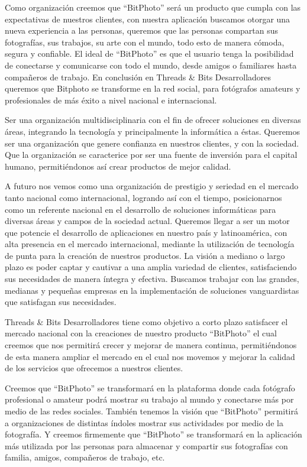 \documentclass{memoria}
\begin{document}
Como organización creemos que “BitPhoto” será un producto que cumpla con las expectativas de nuestros clientes, con nuestra aplicación buscamos otorgar una nueva experiencia a las personas, queremos que las personas compartan sus fotografías, sus trabajos, su arte con el mundo, todo esto de manera cómoda, segura y confiable. El ideal de “BitPhoto” es que el usuario tenga la posibilidad de conectarse y comunicarse con todo el mundo, desde amigos o familiares hasta compañeros de trabajo. En conclusión en Threads \& Bits Desarrolladores queremos que Bitphoto se transforme en la red social, para fotógrafos amateurs y profesionales de más éxito a nivel nacional e internacional.




Ser una organización multidisciplinaria con el fin de ofrecer soluciones en diversas áreas, integrando la tecnología y principalmente la informática a éstas. Queremos ser una organización que genere confianza en nuestros clientes, y con la sociedad. Que la organización se caracterice por ser una fuente de inversión para el capital humano, permitiéndonos así crear productos de mejor calidad.

A futuro nos vemos como una organización de prestigio y seriedad en el mercado tanto nacional como internacional, logrando así con el tiempo, posicionarnos como un referente nacional en el desarrollo de soluciones informáticas para diversas áreas y campos de la sociedad actual. Queremos llegar a ser un motor que potencie el desarrollo de aplicaciones en nuestro país y latinoamérica, con alta presencia en el mercado internacional, mediante la utilización de tecnología de punta para la creación de nuestros productos. La visión a mediano o largo plazo es poder captar y cautivar a una amplia variedad de clientes, satisfaciendo sus necesidades de manera íntegra y efectiva. Buscamos trabajar con las grandes, medianas y pequeñas empresas en la implementación de soluciones vanguardistas que satisfagan sus necesidades.

Threads \& Bits Desarrolladores tiene como objetivo a corto plazo satisfacer el mercado nacional con la creaciones de nuestro producto “BitPhoto” el cual creemos que nos permitirá crecer y mejorar de manera continua, permitiéndonos de esta manera ampliar el mercado en el cual nos movemos  y mejorar la calidad de los servicios que ofrecemos a nuestros clientes.

Creemos que “BitPhoto” se transformará en la plataforma donde cada fotógrafo profesional o amateur podrá mostrar su trabajo al mundo y conectarse más por medio de las redes sociales.  También tenemos la visión que “BitPhoto” permitirá a organizaciones de distintas índoles mostrar sus actividades por medio de la fotografía. Y creemos firmemente que “BitPhoto” se transformará en la aplicación más utilizada por las personas para almacenar y compartir sus fotografías con familia, amigos, compañeros de trabajo, etc.
\end{document}
